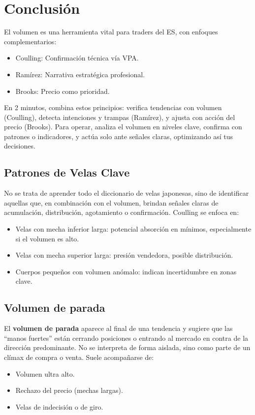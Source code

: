\section{Conclusi\'on}

El volumen es una herramienta vital para traders del ES, con enfoques complementarios:
\begin{itemize}
    \item Coulling: Confirmaci\'on t\'ecnica v\'ia VPA.
    \item Ram\'irez: Narrativa estrat\'egica profesional.
    \item Brooks: Precio como prioridad.
\end{itemize}
En 2 minutos, combina estos principios: verifica tendencias con volumen (Coulling), detecta intenciones y trampas (Ram\'irez), y ajusta con acci\'on del precio (Brooks). Para operar, analiza el volumen en niveles clave, confirma con patrones o indicadores, y act\'ua solo ante se\~nales claras, optimizando as\'i tus decisiones.


\subsection*{Patrones de Velas Clave}

No se trata de aprender todo el diccionario de velas japonesas, sino de identificar aquellas que, en combinación con el volumen, brindan señales claras de acumulación, distribución, agotamiento o confirmación. Coulling se enfoca en:
\begin{itemize}
  \item Velas con mecha inferior larga: potencial absorción en mínimos, especialmente si el volumen es alto.
  \item Velas con mecha superior larga: presión vendedora, posible distribución.
  \item Cuerpos pequeños con volumen anómalo: indican incertidumbre en zonas clave.
\end{itemize}

\subsection*{Volumen de parada}

El \textbf{volumen de parada} aparece al final de una tendencia y sugiere que las ``manos fuertes'' están cerrando posiciones o entrando al mercado en contra de la dirección predominante. No se interpreta de forma aislada, sino como parte de un clímax de compra o venta. Suele acompañarse de:
\begin{itemize}
  \item Volumen ultra alto.
  \item Rechazo del precio (mechas largas).
  \item Velas de indecisión o de giro.
\end{itemize}

